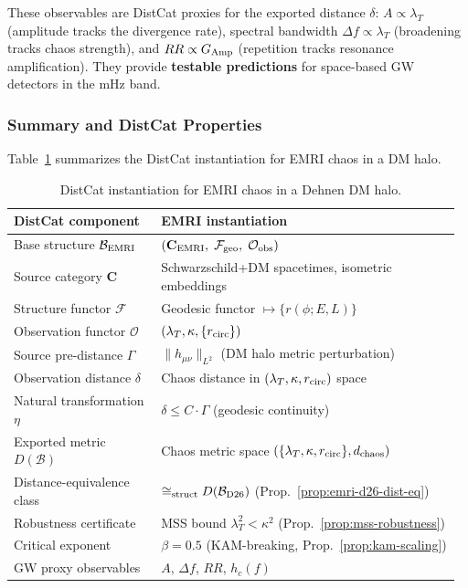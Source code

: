 These observables are DistCat proxies for the exported distance $\delta$: $A \propto \lambda_T$ (amplitude tracks the divergence rate), spectral bandwidth $\Delta f \propto \lambda_T$ (broadening tracks chaos strength), and $RR \propto G_{\rm Amp}$ (repetition tracks resonance amplification). They provide \textbf{testable predictions} for space-based GW detectors in the mHz band.

\subsubsection{Summary and DistCat Properties}\label{subsec:emri-summary}

Table~\ref{tab:emri-distcat} summarizes the DistCat instantiation for EMRI chaos in a DM halo.

\begin{table}[t]
\centering
\begin{tabular}{@{} >{\raggedright\arraybackslash}p{0.32\linewidth} >{\raggedright\arraybackslash}p{0.65\linewidth}@{}}
\toprule
\textbf{DistCat component} & \textbf{EMRI instantiation} \\
\midrule
Base structure $\mathcal{B}_{\rm EMRI}$ & $(\mathbf{C}_{\rm EMRI},\; \mathcal{F}_{\rm geo},\; \mathcal{O}_{\rm obs})$ \\
Source category $\mathbf{C}$ & Schwarzschild+DM spacetimes, isometric embeddings \\
Structure functor $\mathcal{F}$ & Geodesic functor $\mapsto \{r(\phi; E,L)\}$ \\
Observation functor $\mathcal{O}$ & $(\lambda_T, \kappa, \{r_{\rm circ}\})$ \\
Source pre-distance $\Gamma$ & $\|h_{\mu\nu}\|_{L^2}$ (DM halo metric perturbation) \\
Observation distance $\delta$ & Chaos distance in $(\lambda_T, \kappa, r_{\rm circ})$ space \\
Natural transformation $\eta$ & $\delta \leq C \cdot \Gamma$ (geodesic continuity) \\
Exported metric $D(\mathcal{B})$ & Chaos metric space $(\{\lambda_T, \kappa, r_{\rm circ}\}, d_{\rm chaos})$ \\
Distance-equivalence class & $\cong_{\rm struct} D(\mathcal{B}_{\rm D26})$ (Prop.~\ref{prop:emri-d26-dist-eq}) \\
Robustness certificate & MSS bound $\lambda_T^2 < \kappa^2$ (Prop.~\ref{prop:mss-robustness}) \\
Critical exponent & $\beta = 0.5$ (KAM-breaking, Prop.~\ref{prop:kam-scaling}) \\
GW proxy observables & $A$, $\Delta f$, $RR$, $h_c(f)$ \\
\bottomrule
\end{tabular}
\caption{DistCat instantiation for EMRI chaos in a Dehnen DM halo.}
\label{tab:emri-distcat}
\end{table}

